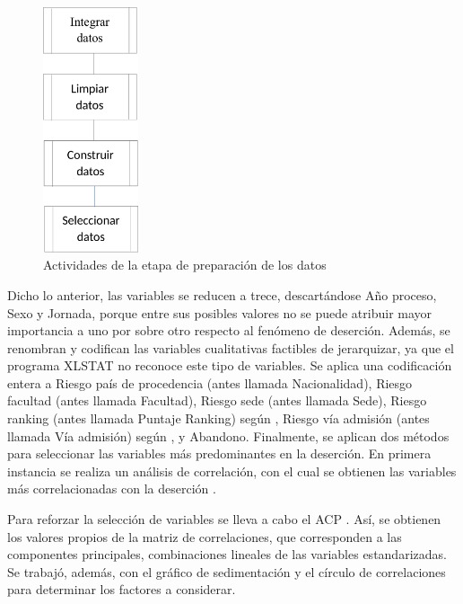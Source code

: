 \documentclass[portuguese]{textolivre}
\begin{document}
\begin{figure}[htbp]
  \centering
  \includegraphics[width=0.25\textwidth]{images/fig-003.pdf}
  \caption{Actividades de la etapa de preparación de los datos}
  \label{Figura 3}
\end{figure}

Dicho lo anterior, las variables se reducen a trece, descartándose Año proceso, Sexo y Jornada, porque entre sus posibles valores no se puede atribuir mayor importancia a uno por sobre otro respecto al fenómeno de deserción. Además, se renombran y codifican las variables cualitativas factibles de jerarquizar, ya que el programa XLSTAT \cite{Addinsoft} no reconoce este tipo de variables. Se aplica una codificación entera a Riesgo país de procedencia (antes llamada Nacionalidad), Riesgo facultad (antes llamada Facultad), Riesgo sede (antes llamada Sede), Riesgo ranking (antes llamada Puntaje Ranking) según \cite{Donoso2007a}, Riesgo vía admisión (antes llamada Vía admisión) según \cite{Donoso2007a}, y Abandono. Finalmente, se aplican dos métodos para seleccionar las variables más predominantes en la deserción. En primera instancia se realiza un análisis de correlación, con el cual se obtienen las variables más correlacionadas con la deserción \cite{Hernandez2018}.

Para reforzar la selección de variables se lleva a cabo el ACP \cite{Fenyes2021}. Así, se obtienen los valores propios de la matriz de correlaciones, que corresponden a las componentes principales, combinaciones lineales de las variables estandarizadas. Se trabajó, además, con el gráfico de sedimentación y el círculo de correlaciones para determinar los factores a considerar.
\end{document}
